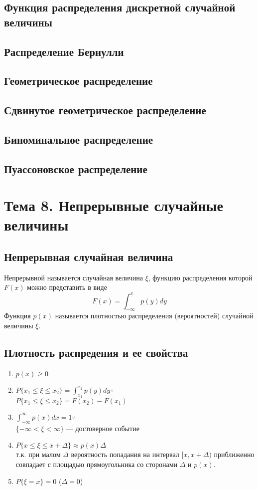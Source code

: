 \documentclass[12pt]{article}
\begin{document}
\subsection{Функция распределения дискретной случайной величины}
\subsection{Распределение Бернулли}
\subsection{Геометрическое распределение}
\subsection{Сдвинутое геометрическое распределение}
\subsection{Биноминальное распределение}
\subsection{Пуассоновское распределение}

\section{Тема 8. Непрерывные случайные величины}
\subsection{Непрерывная случайная величина}
Непрерывной называется случайная величина $\xi$,
функцию распределения которой $F(x)$ можно представить в виде
\[F(x) = \int^{x}_{-\infty}p(y)dy\]
Функция $p(x)$ называется плотностью распределения (вероятностей) случайной величины $\xi$.

\subsection{Плотность распредения и ее свойства}
\begin{enumerate}
	\item $p(x) \geq 0$
	\item $P\{x_1 \leq \xi \leq x_2\} = \int^{x_2}_{x_1}p(y)dy \because$ \\
	      $P\{x_1 \leq \xi \leq x_2\} = F(x_2) - F(x_1)$
	\item $\int^{\infty}_{-\infty}p(x)dx = 1 \because$ \\
	      $\{-\infty < \xi < \infty\}$ --- достоверное событие
	\item $P\{x \leq \xi \leq x + \Delta\} \approx p(x)\Delta$ \\
	      т.к. при малом $\Delta$ вероятность попадания на интервал $[x, x + \Delta)$
	      приближенно совпадает с площадью прямоугольника со сторонами $\Delta$ и $p(x)$.
	\item $P\{\xi = x\} = 0$ ($\Delta = 0$)
\end{enumerate}
\end{document}
